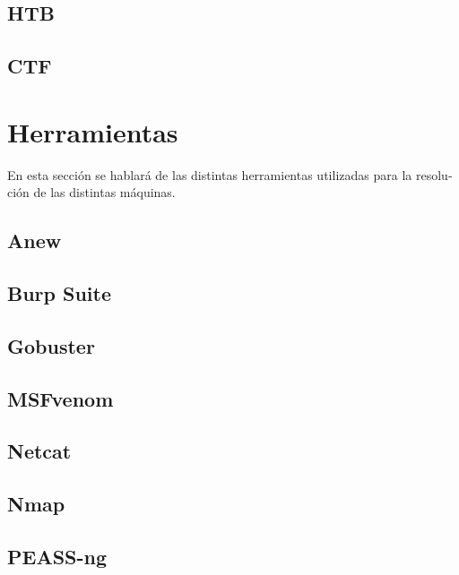 \documentclass[a4paper, 12pt]{article} %
\begin{document}
\begin{otherlanguage}{spanish}
    \subsection{\acrlong{HTB}}
    

    \subsection{\acrlong{CTF}}
    

    \newpage
    \section{Herramientas}
    En esta sección se hablará de las distintas herramientas utilizadas para la resolución de las distintas máquinas.
    
    \subsection{Anew}
    
    
    \subsection{Burp Suite}
    
    
    \subsection{Gobuster}
    
    
    \subsection{MSFvenom}
    
    
    \subsection{Netcat}
    
    
    \subsection{Nmap}
    
    
    \subsection{PEASS-ng}
    


\end{otherlanguage}
\end{document}
